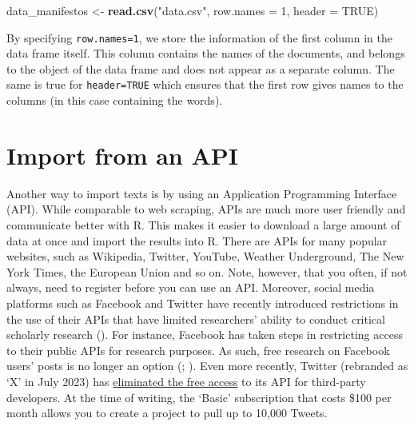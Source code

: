 \documentclass[
]{book}
\newenvironment{Shaded}{\begin{snugshade}}{\end{snugshade}}
\newcommand{\AttributeTok}[1]{\textcolor[rgb]{0.13,0.29,0.53}{#1}}
\newcommand{\ConstantTok}[1]{\textcolor[rgb]{0.56,0.35,0.01}{#1}}
\newcommand{\DecValTok}[1]{\textcolor[rgb]{0.00,0.00,0.81}{#1}}
\newcommand{\FunctionTok}[1]{\textcolor[rgb]{0.13,0.29,0.53}{\textbf{#1}}}
\newcommand{\NormalTok}[1]{#1}
\newcommand{\OtherTok}[1]{\textcolor[rgb]{0.56,0.35,0.01}{#1}}
\newcommand{\StringTok}[1]{\textcolor[rgb]{0.31,0.60,0.02}{#1}}
\begin{document}
\begin{Shaded}
\begin{Highlighting}[]
\NormalTok{data\_manifestos }\OtherTok{\textless{}{-}} \FunctionTok{read.csv}\NormalTok{(}\StringTok{"data.csv"}\NormalTok{, }\AttributeTok{row.names =} \DecValTok{1}\NormalTok{, }\AttributeTok{header =} \ConstantTok{TRUE}\NormalTok{)}
\end{Highlighting}
\end{Shaded}

By specifying \texttt{row.names=1}, we store the information of the first column in the data frame itself. This column contains the names of the documents, and belongs to the object of the data frame and does not appear as a separate column. The same is true for \texttt{header=TRUE} which ensures that the first row gives names to the columns (in this case containing the words).

\section{Import from an API}\label{import-from-an-api}

Another way to import texts is by using an Application Programming Interface (API). While comparable to web scraping, APIs are much more user friendly and communicate better with R. This makes it easier to download a large amount of data at once and import the results into R. There are APIs for many popular websites, such as Wikipedia, Twitter, YouTube, Weather Underground, The New York Times, the European Union and so on. Note, however, that you often, if not always, need to register before you can use an API. Moreover, social media platforms such as Facebook and Twitter have recently introduced restrictions in the use of their APIs that have limited researchers' ability to conduct critical scholarly research (). For instance, Facebook has taken steps in restricting access to their public APIs for research purposes. As such, free research on Facebook users' posts is no longer an option (; ). Even more recently, Twitter (rebranded as `X' in July 2023) has \href{https://edition.cnn.com/2023/02/03/tech/twitter-api-what-is-pricing-change-cec/index.html}{eliminated the free access} to its API for third-party developers. At the time of writing, the `Basic' subscription that costs \$100 per month allows you to create a project to pull up to 10,000 Tweets.
\end{document}
